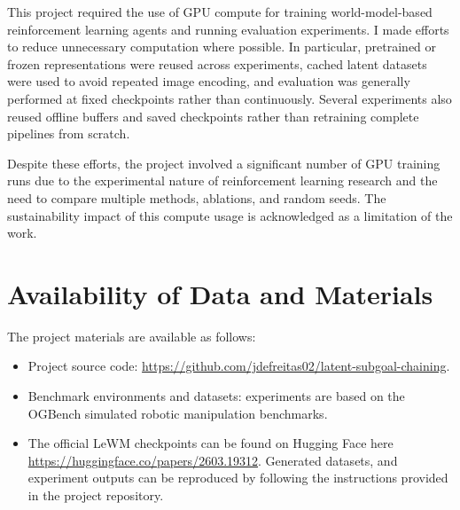This project required the use of GPU compute for training world-model-based reinforcement learning agents and running evaluation experiments. I made efforts to reduce unnecessary computation where possible. In particular, pretrained or frozen representations were reused across experiments, cached latent datasets were used to avoid repeated image encoding, and evaluation was generally performed at fixed checkpoints rather than continuously. Several experiments also reused offline buffers and saved checkpoints rather than retraining complete pipelines from scratch.

Despite these efforts, the project involved a significant number of GPU training runs due to the experimental nature of reinforcement learning research and the need to compare multiple methods, ablations, and random seeds. The sustainability impact of this compute usage is acknowledged as a limitation of the work.

\section{Availability of Data and Materials}
\label{sec:decl-availability}

The project materials are available as follows:

\begin{itemize}
    \item Project source code: \url{https://github.com/jdefreitas02/latent-subgoal-chaining}.
    \item Benchmark environments and datasets: experiments are based on the OGBench simulated robotic manipulation benchmarks.
    \item The official LeWM checkpoints can be found on Hugging Face here \url{https://huggingface.co/papers/2603.19312}. Generated datasets, and experiment outputs can be reproduced by following the instructions provided in the project repository.
\end{itemize}
